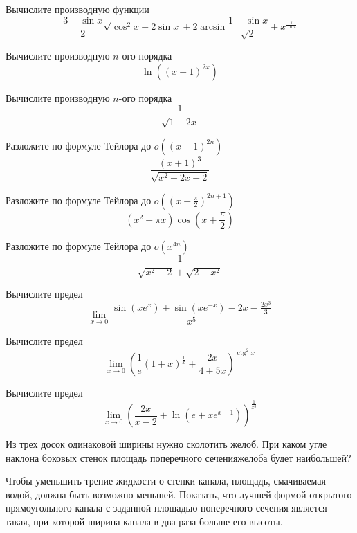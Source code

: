 \documentclass[russian]{article}
\DeclareMathOperator{\ctg}{ctg}
\begin{document}
Вычислите производную функции
$$\frac{3 - \sin x}{2}\sqrt{\cos^2 x - 2 \sin x} + 2\arcsin \frac{1 + \sin x}{\sqrt{2}} + x^\frac{7}{\ln x}$$

Вычислите производную $n$-ого порядка
$$\ln \left((x - 1)^{2x}\right)$$

Вычислите производную $n$-ого порядка
$$\frac{1}{\sqrt{1 - 2x}}$$


Разложите по формуле Тейлора до $o((x + 1)^{2n})$
$$\frac{(x + 1)^3}{\sqrt{x^2 + 2x + 2}}$$

Разложите по формуле Тейлора до $o((x - \frac{\pi}{2})^{2n + 1})$
$$(x^2 - \pi x) \cos\left(x + \frac{\pi}{2}\right)$$

Разложите по формуле Тейлора до $o(x^{4n})$
$$\frac{1}{\sqrt{x^2 + 2} + \sqrt{2 - x^2}}$$


Вычислите предел
$$\lim_{x \to 0}\frac{\sin(xe^x) + \sin (xe^{-x}) - 2x - \frac{2x^3}{3}}{x^5}$$

Вычислите предел
$$\lim_{x \to 0} \left(\frac{1}{e}(1 + x)^{\frac{1}{x}} + \frac{2x}{4 + 5x}\right)^{\ctg^2 x} $$

Вычислите предел
$$\lim_{x \to 0} \left(\frac{2x}{x - 2} + \ln(e + xe^{x + 1})\right)^{\frac{1}{x^3}}$$


Из трех досок одинаковой ширины нужно сколотить желоб. При каком угле наклона боковых стенок площадь поперечного сеченияжелоба будет наибольшей?


Чтобы уменьшить трение жидкости о стенки канала, площадь, смачиваемая водой, должна быть возможно меньшей. Показать, что лучшей формой открытого прямоугольного канала с заданной площадью поперечного сечения является такая, при которой ширина канала в два раза больше его высоты.

\end{document}
